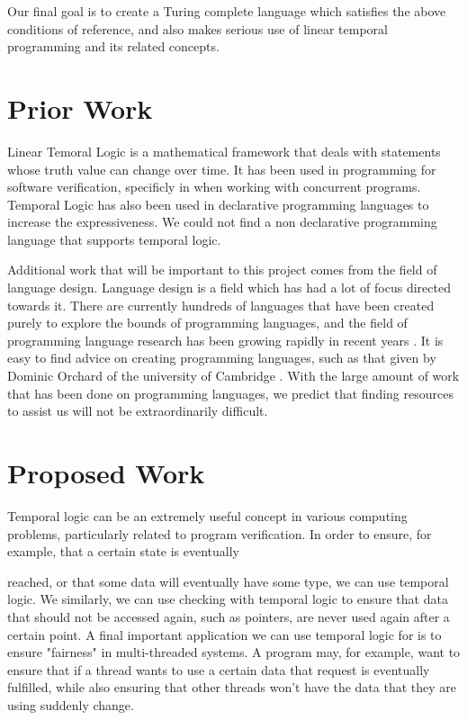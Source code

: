 \documentclass[numbers]{sigplanconf}
\begin{document}
Our final goal is to create a Turing complete language which satisfies
the above conditions of reference, and also makes serious use of linear temporal programming and its related concepts.

\section{Prior Work}
 

Linear Temoral Logic is a mathematical framework that deals with
statements whose truth value can change over time. It has been used in programming for
software verification, specificly in when working with concurrent
programs\cite{AutomaticVerification, SimpleVerification}. Temporal
Logic has also been used in declarative programming languages to
increase the expressiveness\cite{DeclarativeTemporal}. We could not find a non declarative programming language that
supports temporal logic. 

Additional work that will be important to this project comes from the field of language design.
Language design is a field which has had a lot of focus directed
towards it. There are currently hundreds of languages that
have been created purely to explore the bounds of programming languages, and the field of programming language research has been growing rapidly in recent years \cite{esolang}. It is easy to find advice on
creating programming languages, such as that given by Dominic Orchard
of the university of Cambridge \cite{4Rs}.  With the large amount of work
that has been done on programming languages, we predict that finding
resources to assist us will not be extraordinarily difficult.

\section{Proposed Work}
Temporal logic can be an extremely useful concept in various 
computing problems, particularly related to program verification. 
In order to ensure, for example, that a certain state is eventually

reached, or that some data will eventually have some type, we can use
temporal logic. We similarly, we can use checking with temporal logic to
 ensure that data that should not be accessed again, such as pointers,
 are never used again after a certain point. A final important 
 application we can use temporal logic for is to ensure "fairness" in
 multi-threaded systems. A program may, for example, want to ensure 
 that if a thread wants to use a certain data that request is
 eventually fulfilled, while also ensuring that other threads won't
 have the data that they are using suddenly change.
\end{document}
